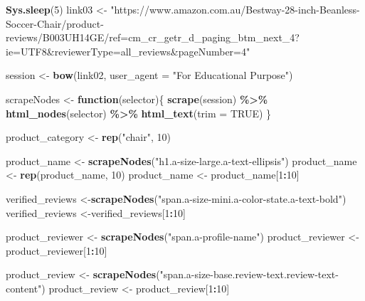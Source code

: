 \documentclass[
]{article}
\newenvironment{Shaded}{\begin{snugshade}}{\end{snugshade}}
\newcommand{\AttributeTok}[1]{\textcolor[rgb]{0.13,0.29,0.53}{#1}}
\newcommand{\ConstantTok}[1]{\textcolor[rgb]{0.56,0.35,0.01}{#1}}
\newcommand{\ControlFlowTok}[1]{\textcolor[rgb]{0.13,0.29,0.53}{\textbf{#1}}}
\newcommand{\DecValTok}[1]{\textcolor[rgb]{0.00,0.00,0.81}{#1}}
\newcommand{\FunctionTok}[1]{\textcolor[rgb]{0.13,0.29,0.53}{\textbf{#1}}}
\newcommand{\NormalTok}[1]{#1}
\newcommand{\OtherTok}[1]{\textcolor[rgb]{0.56,0.35,0.01}{#1}}
\newcommand{\SpecialCharTok}[1]{\textcolor[rgb]{0.81,0.36,0.00}{\textbf{#1}}}
\newcommand{\StringTok}[1]{\textcolor[rgb]{0.31,0.60,0.02}{#1}}
\begin{document}
\begin{Shaded}
\begin{Highlighting}[]
   \FunctionTok{Sys.sleep}\NormalTok{(}\DecValTok{5}\NormalTok{)}
\NormalTok{link03 }\OtherTok{\textless{}{-}} \StringTok{"https://www.amazon.com.au/Bestway{-}28{-}inch{-}Beanless{-}Soccer{-}Chair/product{-}reviews/B003UH14GE/ref=cm\_cr\_getr\_d\_paging\_btm\_next\_4?ie=UTF8\&reviewerType=all\_reviews\&pageNumber=4"}


\NormalTok{  session }\OtherTok{\textless{}{-}} \FunctionTok{bow}\NormalTok{(link02,}
               \AttributeTok{user\_agent =} \StringTok{"For Educational Purpose"}\NormalTok{)}

\NormalTok{  scrapeNodes }\OtherTok{\textless{}{-}} \ControlFlowTok{function}\NormalTok{(selector)\{}
    \FunctionTok{scrape}\NormalTok{(session) }\SpecialCharTok{\%\textgreater{}\%}
      \FunctionTok{html\_nodes}\NormalTok{(selector) }\SpecialCharTok{\%\textgreater{}\%}
      \FunctionTok{html\_text}\NormalTok{(}\AttributeTok{trim =} \ConstantTok{TRUE}\NormalTok{)}
\NormalTok{  \}}

\NormalTok{  product\_category }\OtherTok{\textless{}{-}} \FunctionTok{rep}\NormalTok{(}\StringTok{"chair"}\NormalTok{, }\DecValTok{10}\NormalTok{)}

\NormalTok{  product\_name }\OtherTok{\textless{}{-}} \FunctionTok{scrapeNodes}\NormalTok{(}\StringTok{"h1.a{-}size{-}large.a{-}text{-}ellipsis"}\NormalTok{)}
\NormalTok{  product\_name }\OtherTok{\textless{}{-}} \FunctionTok{rep}\NormalTok{(product\_name, }\DecValTok{10}\NormalTok{)}
\NormalTok{  product\_name }\OtherTok{\textless{}{-}}\NormalTok{ product\_name[}\DecValTok{1}\SpecialCharTok{:}\DecValTok{10}\NormalTok{]}
  
\NormalTok{  verified\_reviews }\OtherTok{\textless{}{-}}\FunctionTok{scrapeNodes}\NormalTok{(}\StringTok{"span.a{-}size{-}mini.a{-}color{-}state.a{-}text{-}bold"}\NormalTok{)}
\NormalTok{  verified\_reviews }\OtherTok{\textless{}{-}}\NormalTok{verified\_reviews[}\DecValTok{1}\SpecialCharTok{:}\DecValTok{10}\NormalTok{]}
  
\NormalTok{  product\_reviewer }\OtherTok{\textless{}{-}} \FunctionTok{scrapeNodes}\NormalTok{(}\StringTok{"span.a{-}profile{-}name"}\NormalTok{)}
\NormalTok{  product\_reviewer }\OtherTok{\textless{}{-}}\NormalTok{ product\_reviewer[}\DecValTok{1}\SpecialCharTok{:}\DecValTok{10}\NormalTok{]}
  
\NormalTok{  product\_review }\OtherTok{\textless{}{-}} \FunctionTok{scrapeNodes}\NormalTok{(}\StringTok{"span.a{-}size{-}base.review{-}text.review{-}text{-}content"}\NormalTok{)}
\NormalTok{  product\_review }\OtherTok{\textless{}{-}}\NormalTok{ product\_review[}\DecValTok{1}\SpecialCharTok{:}\DecValTok{10}\NormalTok{]}
  

\end{Highlighting}
\end{Shaded}
\end{document}
